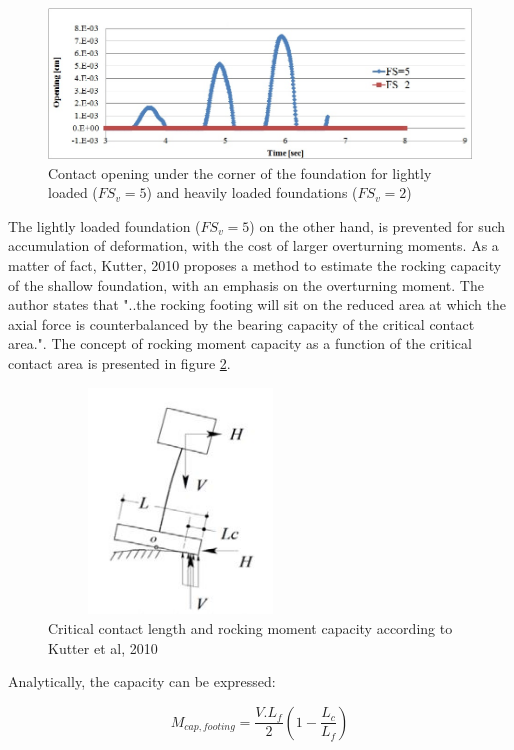   \begin{figure}[!h]
  	\centering
  	\includegraphics[width=0.7 \linewidth]{"opening"}
  	\caption{Contact opening under the corner of the foundation for lightly loaded ($FS_v=5$) and heavily loaded foundations ($FS_v=2$)}
  	\label{opening}
  \end{figure}
 
 The lightly loaded foundation ($FS_v=5$) on the other hand, is prevented for such accumulation of deformation, with the cost of larger overturning moments. As a matter of fact, Kutter, 2010 \cite{kutter2010estimation} proposes a method to estimate the rocking capacity of the shallow foundation, with an emphasis on the overturning moment. The author states that "..the rocking footing will sit on the reduced area at which the axial force is counterbalanced by the bearing capacity of the critical contact area.". The concept of rocking moment capacity as a function of the critical contact area is presented in figure \ref{rocking_cap}.
 \begin{figure}
 	\centering
 	\includegraphics[width=7cm,height=6cm, keepaspectratio]{"rocking_cap"}
 	\caption{Critical contact length and rocking moment capacity according to \mbox{Kutter} et al, 2010}
 	\label{rocking_cap}
 \end{figure}
 
 Analytically, the capacity can be expressed: 
 
 \begin{equation}
 M_{cap,footing} = \frac{V.L_f}{2}(1-\frac{L_c}{L_f})
 \end{equation}
 
